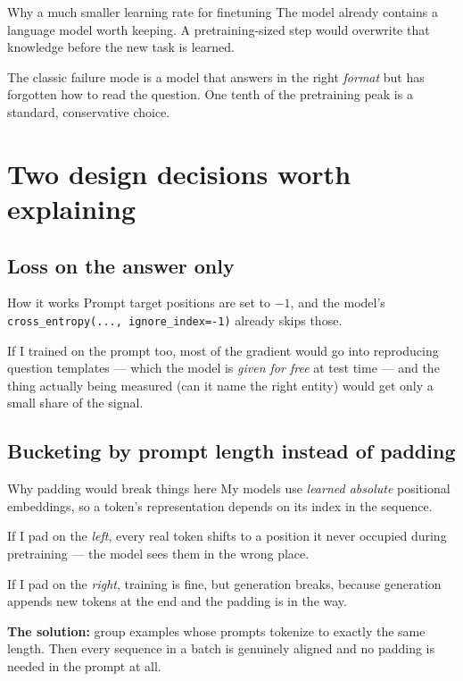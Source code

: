 \documentclass[11pt]{report}
\newcommand{\p}[1]{\texttt{#1}}
\begin{document}
\begin{concept}{Why a much smaller learning rate for finetuning}
The model already contains a language model worth keeping. A pretraining-sized
step would overwrite that knowledge before the new task is learned.

The classic failure mode is a model that answers in the right \emph{format} but
has forgotten how to read the question. One tenth of the pretraining peak is a
standard, conservative choice.
\end{concept}

\section{Two design decisions worth explaining}

\subsection{Loss on the answer only}

\begin{implementation}{How it works}
Prompt target positions are set to $-1$, and the model's
\p{cross\_entropy(..., ignore\_index=-1)} already skips those.

If I trained on the prompt too, most of the gradient would go into reproducing
question templates --- which the model is \emph{given for free} at test time ---
and the thing actually being measured (can it name the right entity) would get
only a small share of the signal.
\end{implementation}

\subsection{Bucketing by prompt length instead of padding}

\begin{concept}{Why padding would break things here}
My models use \emph{learned absolute} positional embeddings, so a token's
representation depends on its index in the sequence.

If I pad on the \emph{left}, every real token shifts to a position it never
occupied during pretraining --- the model sees them in the wrong place.

If I pad on the \emph{right}, training is fine, but generation breaks, because
generation appends new tokens at the end and the padding is in the way.

\textbf{The solution:} group examples whose prompts tokenize to exactly the same
length. Then every sequence in a batch is genuinely aligned and no padding is
needed in the prompt at all.
\end{concept}
\end{document}
